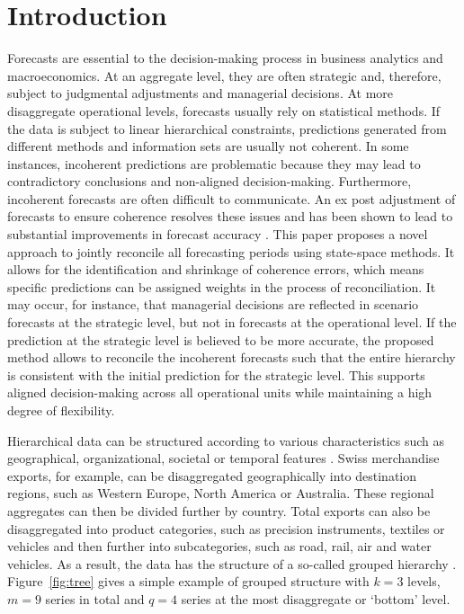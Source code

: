 \documentclass[a4paper,fleqn,11pt]{article}
\begin{document}
\section{Introduction}\label{sec:intro}

Forecasts are essential to the decision-making process in business analytics and macroeconomics. At an aggregate level, they are often strategic and, therefore, subject to judgmental adjustments and managerial decisions. At more disaggregate operational levels, forecasts usually rely on statistical methods. If the data is subject to linear hierarchical constraints, predictions generated from different methods and information sets are usually not coherent. In some instances, incoherent predictions are problematic because they may lead to contradictory conclusions and non-aligned decision-making. Furthermore, incoherent forecasts are often difficult to communicate. An ex post adjustment of forecasts to ensure coherence resolves these issues and has been shown to lead to substantial improvements in forecast accuracy \citep[see][and references therein]{Wickramasuriya2015}. This paper proposes a novel approach to jointly reconcile all forecasting periods using state-space methods. It allows for the identification and shrinkage of coherence errors, which means specific predictions can be assigned weights in the process of reconciliation. It may occur, for instance, that managerial decisions are reflected in scenario forecasts at the strategic level, but not in forecasts at the operational level. If the prediction at the strategic level is believed to be more accurate, the proposed method allows to reconcile the incoherent forecasts such that the entire hierarchy is consistent with the initial prediction for the strategic level. This supports aligned decision-making across all operational units while maintaining a high degree of flexibility.

Hierarchical data can be structured according to various characteristics such as geographical, organizational, societal or temporal features \citep{Kourentzes2019}. Swiss merchandise exports, for example, can be disaggregated geographically into destination regions, such as Western Europe, North America or Australia. These regional aggregates can then be divided further by country. Total exports can also be disaggregated into product categories, such as precision instruments, textiles or vehicles and then further into subcategories, such as road, rail, air and water vehicles. As a result, the data has the structure of a so-called grouped hierarchy \citep[see][and references therein]{Hyndman2018}. Figure~\ref{fig:tree} gives a simple example of grouped structure with $k = 3$ levels, $m = 9$ series in total and $q = 4$ series at the most disaggregate or `bottom' level. 
\end{document}

